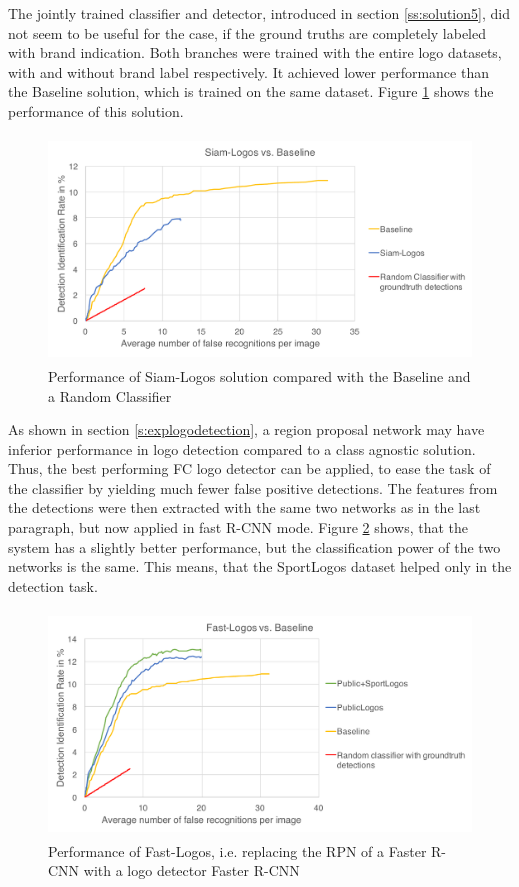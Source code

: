 The jointly trained classifier and detector, introduced in section \ref{ss:solution5}, did not seem to be useful for the case, if the ground truths are completely labeled with brand indication. Both branches were trained with the entire logo datasets, with and without brand label respectively. It achieved lower performance than the Baseline solution, which is trained on the same dataset. Figure \ref{f:sol5} shows the performance of this solution.
\begin{figure}
  \centering
  \includegraphics[height=60mm]{images/mt/sol5.pdf}
  \caption{Performance of Siam-Logos solution compared with the Baseline and a Random Classifier}
  \label{f:sol5}
\end{figure}
 As shown in section \ref{s:explogodetection}, a region proposal network may have inferior performance in logo detection compared to a class agnostic solution. Thus, the best performing FC logo detector can be applied, to ease the task of the classifier by yielding much fewer false positive detections. The features from the detections were then extracted with the same two networks as in the last paragraph, but now applied in fast R-CNN mode. Figure \ref{f:sol3} shows, that the system has a slightly better performance, but the classification power of the two networks is the same. This means, that the SportLogos dataset helped only in the detection task.
 \begin{figure}
  \centering
  \includegraphics[height=60mm]{images/mt/sol3.pdf}
  \caption{Performance of Fast-Logos, i.e. replacing the RPN of a Faster R-CNN with a logo detector Faster R-CNN}
  \label{f:sol3}
\end{figure}

